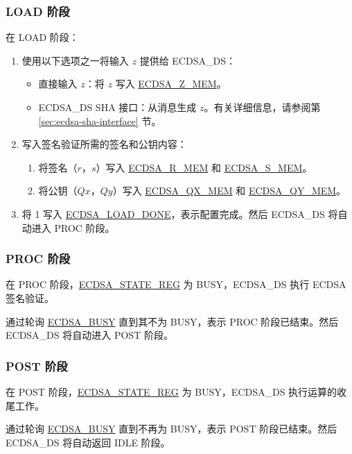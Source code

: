 \documentclass[main\_\_CN.tex]{subfiles}
\begin{document}
\subsubsection{LOAD 阶段}
在 LOAD 阶段：

\begin{enumerate}
	\item 使用以下选项之一将输入 $z$ 提供给 ECDSA\_DS：
	      \begin{itemize}
		      \item 直接输入 $z$：将 $z$ 写入 \hyperref[tab:ecdsa-memory]{ECDSA\_Z\_MEM}。
		      \item ECDSA\_DS SHA 接口：从消息生成 $z$。有关详细信息，请参阅第 \ref{sec:ecdsa-sha-interface} 节。
	      \end{itemize}
		      \item 写入签名验证所需的签名和公钥内容：
		            \begin{enumerate}
			            \item 将签名（$r$，$s$）写入 \hyperref[tab:ecdsa-memory]{ECDSA\_R\_MEM} 和 \hyperref[tab:ecdsa-memory]{ECDSA\_S\_MEM}。
			            \item 将公钥（$Qx$，$Qy$）写入 \hyperref[tab:ecdsa-memory]{ECDSA\_QX\_MEM} 和 \hyperref[tab:ecdsa-memory]{ECDSA\_QY\_MEM}。
		            \end{enumerate}
	\item 将 1 写入 \hyperref[fielddesc:ECDSALOADDONE]{ECDSA\_LOAD\_DONE}，表示配置完成。然后 ECDSA\_DS 将自动进入 PROC 阶段。
\end{enumerate}

\subsubsection{PROC 阶段}

在 PROC 阶段，\hyperref[regdesc:ECDSASTATEREG]{ECDSA\_STATE\_REG} 为 BUSY，ECDSA\_DS 执行 ECDSA 签名验证。

通过轮询 \hyperref[fielddesc:ECDSABUSY]{ECDSA\_BUSY} 直到其不为 BUSY，表示 PROC 阶段已结束。然后 ECDSA\_DS 将自动进入 POST 阶段。


\subsubsection{POST 阶段}

在 POST 阶段，\hyperref[regdesc:ECDSASTATEREG]{ECDSA\_STATE\_REG} 为 BUSY，ECDSA\_DS 执行运算的收尾工作。

通过轮询 \hyperref[fielddesc:ECDSABUSY]{ECDSA\_BUSY} 直到不再为 BUSY，表示 POST 阶段已结束。然后 ECDSA\_DS 将自动返回 IDLE 阶段。
\end{document}
